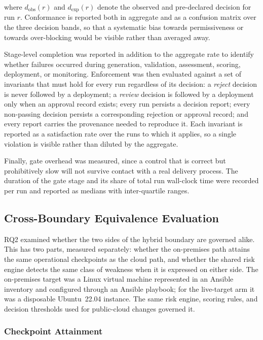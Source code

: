 where $d_{\mathrm{obs}}(r)$ and $d_{\mathrm{exp}}(r)$ denote the observed and
pre-declared decision for run $r$. Conformance is reported both in aggregate and
as a confusion matrix over the three decision bands,
so that a systematic bias towards permissiveness or towards over-blocking would
be visible rather than averaged away.

Stage-level completion was reported in addition to the aggregate rate to identify
whether failures occurred during generation, validation, assessment, scoring,
deployment, or monitoring. Enforcement was then evaluated against a set of
invariants that must hold for every run regardless of its decision: a
\emph{reject} decision is never followed by a deployment; a \emph{review}
decision is followed by a deployment only when an approval record exists; every
run persists a decision report; every non-passing decision persists a
corresponding rejection or approval record; and every report carries the
provenance needed to reproduce it. Each invariant is reported as a satisfaction
rate over the runs to which it applies, so a single violation is visible rather
than diluted by the aggregate.

Finally, gate overhead was measured, since a control that is correct but
prohibitively slow will not survive contact with a real delivery process. The
duration of the gate stage and its share of total run wall-clock time were
recorded per run and reported as medians with inter-quartile ranges.

\subsection{Cross-Boundary Equivalence Evaluation}
\label{subsec:evaluation-rq2}

RQ2 examined whether the two sides of the hybrid boundary are governed alike.
This has two parts, measured separately: whether the on-premises path attains
the same operational checkpoints as the cloud path, and whether the shared risk
engine detects the same class of weakness when it is expressed on either side.
The on-premises target was a Linux virtual machine represented in an Ansible
inventory and configured through an Ansible playbook; for the live-target arm it
was a disposable Ubuntu~22.04 instance. The same risk engine, scoring rules, and
decision thresholds used for public-cloud changes governed it.

\subsubsection{Checkpoint Attainment}

